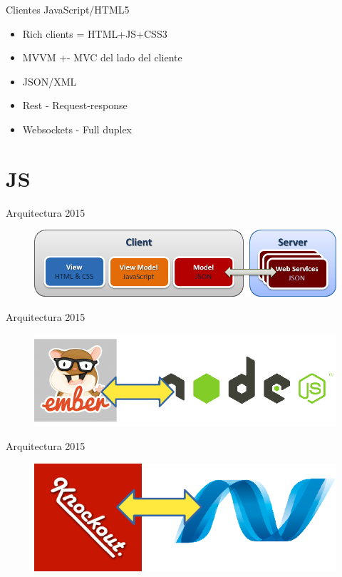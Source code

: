 \documentclass{beamer}
\begin{document}
\begin{frame}{Clientes JavaScript/HTML5}
		\begin{itemize}
			\item Rich clients = HTML+JS+CSS3
			\item MVVM +- MVC del lado del cliente
			\item JSON/XML
			\item Rest - Request-response
			\item Websockets - Full duplex
		\end{itemize}
\end{frame}

\section{JS}
\begin{frame}{Arquitectura 2015}
	\begin{figure}
\centering
\includegraphics[width=0.9\linewidth]{Images/arq2015b}
\end{figure}
\end{frame}

\begin{frame}{Arquitectura 2015}
	\begin{figure}
\centering
\includegraphics[width=0.8\linewidth]{Images/embernode.png}
\end{figure}
\end{frame}

\begin{frame}{Arquitectura 2015}
	\begin{figure}
\centering
\includegraphics[width=0.8\linewidth]{Images/knockoutnet.png}
\end{figure}
\end{frame}
\end{document}
